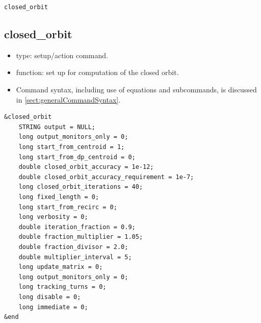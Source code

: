 \documentclass[11pt]{article}
\begin{document}
\newpage
\begin{center}{\Large\verb|closed_orbit|}\end{center}
\subsection{closed\_orbit \label{subsec:closedorbit}}

\begin{itemize}
\item type: setup/action command.
\item function: set up for computation of the closed orbit.
\item Command syntax, including use of equations and subcommands, is discussed in \ref{sect:generalCommandSyntax}.
\end{itemize}

\begin{verbatim}
&closed_orbit
    STRING output = NULL;
    long output_monitors_only = 0;
    long start_from_centroid = 1;
    long start_from_dp_centroid = 0;
    double closed_orbit_accuracy = 1e-12;
    double closed_orbit_accuracy_requirement = 1e-7;
    long closed_orbit_iterations = 40;
    long fixed_length = 0;
    long start_from_recirc = 0;
    long verbosity = 0;
    double iteration_fraction = 0.9;
    double fraction_multiplier = 1.05;
    double fraction_divisor = 2.0;
    double multiplier_interval = 5;
    long update_matrix = 0;
    long output_monitors_only = 0;
    long tracking_turns = 0;
    long disable = 0;
    long immediate = 0;
&end
\end{verbatim}
\end{document}
